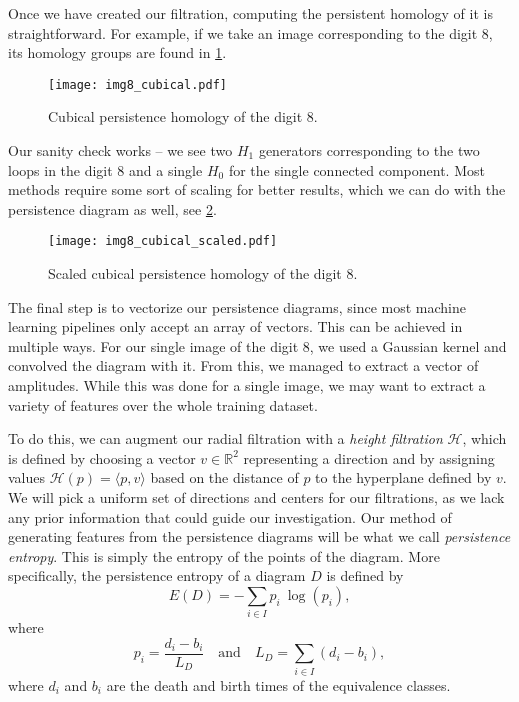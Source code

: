 Once we have created our filtration, computing the persistent homology of it is straightforward. For example, if we take an image corresponding to the digit 8, its homology groups are found in \ref{fig:img8_cubical}.

\begin{figure}[h!]
  \centering
  \texttt{[image: img8\_cubical.pdf]}
  \caption{Cubical persistence homology of the digit 8.}
  \label{fig:img8_cubical}
\end{figure}

Our sanity check works -- we see two $H_{1}$ generators corresponding to the two loops in the digit 8 and a single $H_{0}$ for the single connected component. Most methods require some sort of scaling for better results, which we can do with the persistence diagram as well, see \ref{fig:img8_cubical_scaled}.

\begin{figure}[h!]
  \centering
  \texttt{[image: img8\_cubical\_scaled.pdf]}
  \caption{Scaled cubical persistence homology of the digit 8.}
  \label{fig:img8_cubical_scaled}
\end{figure}

The final step is to vectorize our persistence diagrams, since most machine learning pipelines only accept an array of vectors. This can be achieved in multiple ways. For our single image of the digit 8, we used a Gaussian kernel and convolved the diagram with it. From this, we managed to extract a vector of amplitudes. While this was done for a single image, we may want to extract a variety of features over the whole training dataset.

To do this, we can augment our radial filtration with a \textit{height filtration} $\mathcal{H}$, which is defined by choosing a vector $v \in \mathbb{R}^{2}$ representing a direction and by assigning values $\mathcal{H}(p) = \langle p, v \rangle$ based on the distance of $p$ to the hyperplane defined by $v$. We will pick a uniform set of directions and centers for our filtrations, as we lack any prior information that could guide our investigation. Our method of generating features from the persistence diagrams will be what we call \textit{persistence entropy}. This is simply the entropy of the points of the diagram. More specifically, the persistence entropy of a diagram $D$ is defined by
\begin{equation*}
  E(D) = -\sum_{i \in I}p_{i}\:\log(p_{i}),
\end{equation*}
where
\begin{equation*}
  p_{i} = \frac{d_{i}-b_{i}}{L_{D}} \quad \text{and} \quad L_{D} = \sum_{i \in I}(d_{i}-b_{i}),
\end{equation*}
where $d_{i}$ and $b_{i}$ are the death and birth times of the equivalence classes.

